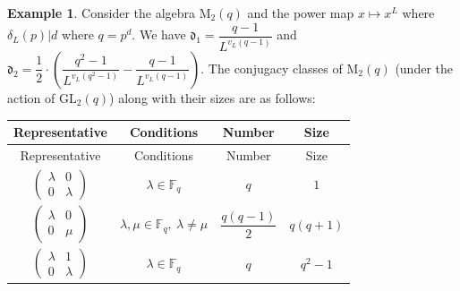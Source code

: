\documentclass[11pt,twoside]{amsart}
\newcommand{\GL}{\mathrm{GL}}
\newcommand{\M}{\mathrm{M}}
\newcommand{\F}{\mathbb{F}}
\renewcommand{\d}{\mathfrak d}
\theoremstyle{definition} %
\newtheorem{example}[lemma]{Example}
\begin{document}
\begin{example}\label{exm-m-2}
Consider the algebra $\M_2(q)$ and the power map $x\mapsto x^L$ where $\delta_L(p)|d$ where $q=p^d$. 
We have $\d_1=\dfrac{q-1}{L^{v_L(q-1)}}$ and $\d_2=\dfrac{1}{2}\cdot\left(\dfrac{q^2-1}{L^{v_L(q^2-1)}}-\dfrac{q-1}{L^{v_L(q-1)}}\right)$.
The conjugacy classes of $\M_2(q)$ (under the action of $\GL_2(q)$) along with their sizes are as follows:
\begin{center}
\renewcommand{\arraystretch}{1.4}
\begin{longtable}{cccc}
\hline
Representative &
Conditions &
Number &
Size \\
\hline
\endfirsthead

\hline
Representative &
Conditions &
Number &
Size \\
\hline
\endhead

\hline
\endfoot

\hline
\endlastfoot

$\begin{pmatrix}
\lambda&0\\
0&\lambda
\end{pmatrix}$
&
$\lambda\in\F_q$
&
$q$
&
$1$
\\

$\begin{pmatrix}
\lambda&0\\
0&\mu
\end{pmatrix}$
&
$\lambda,\mu\in\F_q,\ \lambda\neq\mu$
&
$\dfrac{q(q-1)}{2}$
&
$q(q+1)$
\\

$\begin{pmatrix}
\lambda&1\\
0&\lambda
\end{pmatrix}$
&
$\lambda\in\F_q$
&
$q$
&
$q^2-1$
\\


\end{longtable}
\end{center}
\end{example}
\end{document}

